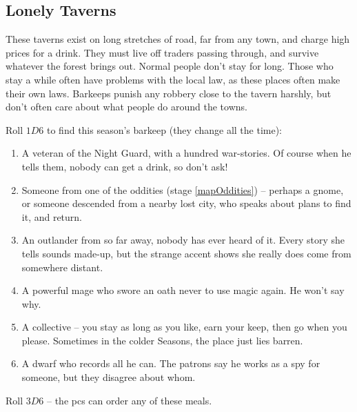 \begin{multicols}{2}

\subsection{Lonely Taverns}
\label{lonelyTaverns}

These taverns exist on long stretches of road, far from any town, and
charge high prices for a drink. They must live off traders passing
through, and survive whatever the forest brings out. Normal people don't
stay for long. Those who stay a while often have problems with the local
law, as these places often make their own laws. Barkeeps punish any
robbery close to the tavern harshly, but don't often care about what
people do around the towns.


Roll $1D6$ to find this season's barkeep (they change all the time):

\begin{enumerate}
\item
  A veteran of the Night Guard, with a hundred war-stories. Of course
  when he tells them, nobody can get a drink, so don't ask!
\item
  Someone from one of the oddities (stage \ref{mapOddities}) -- perhaps a gnome, or someone
  descended from a nearby lost city, who speaks about plans to find it, and return.
\item
  An outlander from so far away, nobody has ever heard of it. Every
  story she tells sounds made-up, but the strange accent shows she really
  does come from somewhere distant.
\item
  A powerful mage who swore an oath never to use magic again. He won't
  say why.
\item
  A collective -- you stay as long as you like, earn your keep, then go
  when you please. Sometimes in the colder Seasons, the place just lies
  barren.
\item
  A dwarf who records all he can. The patrons say he works as a spy for
  someone, but they disagree about whom.
\end{enumerate}


Roll $3D6$ -- the \glspl{pc} can order any of these meals.

\newcommand\menuItem[3][(\arabic{r12} \glspl{cp})]{%
  \randomdozen%
  \randomthree%
  \randomfourB%
  \ifodd\value{enumi}
    \randomthreeC%
    \randomfour%
  \fi
  \item
  \textbf{#2:}
  #3
  #1
}


\end{multicols}
